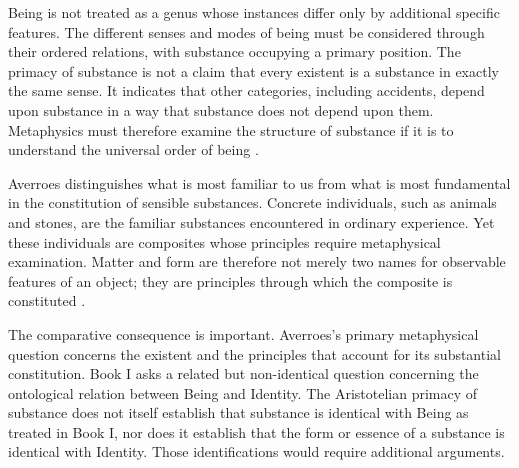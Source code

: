 \label{para:VS.B01.P01.C08.S15.SS03.P002}

Being is not treated as a genus whose instances differ only by
additional specific features. The different senses and modes
of being must be considered through their ordered relations,
with substance occupying a primary position. The primacy of
substance is not a claim that every existent is a substance
in exactly the same sense. It indicates that other categories,
including accidents, depend upon substance in a way that
substance does not depend upon them. Metaphysics must therefore
examine the structure of substance if it is to understand the
universal order of being
\citep{AristotleMetaphysics,
BenAhmedPasnauIbnRushdSEP2025}.

\label{para:VS.B01.P01.C08.S15.SS03.P003}

Averroes distinguishes what is most familiar to us from what
is most fundamental in the constitution of sensible substances.
Concrete individuals, such as animals and stones, are the
familiar substances encountered in ordinary experience.
Yet these individuals are composites whose principles require
metaphysical examination. Matter and form are therefore not
merely two names for observable features of an object; they
are principles through which the composite is constituted
\citep{AverroesEpitomeMetaphysicsArnzen2010,
AverroesLongCommentaryMetaphysicsBouyges1990,
BenAhmedPasnauIbnRushdSEP2025}.

\label{para:VS.B01.P01.C08.S15.SS03.P004}

The comparative consequence is important. Averroes's primary
metaphysical question concerns the existent and the principles
that account for its substantial constitution. Book I asks
a related but non-identical question concerning the ontological
relation between Being and Identity. The Aristotelian primacy
of substance does not itself establish that substance is
identical with Being as treated in Book I, nor does it establish
that the form or essence of a substance is identical with
Identity. Those identifications would require additional
arguments.



